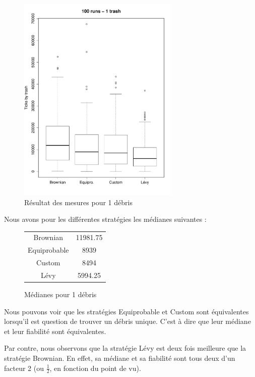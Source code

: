 

\begin{figure}[H]
	\begin{center}
		\includegraphics[height=10cm]{diagrams/1Tr_all.pdf}
		\caption{Résultat des mesures pour 1 débris}
		\label{fig:1Trash}
	\end{center}
\end{figure}


Nous avons pour les différentes stratégies les médianes suivantes :

\begin{figure}[H]
	\begin{center}
		\begin{tabular}{ | c | c | }
			\hline
			Brownian & 11981.75 \\
			Equiprobable & 8939 \\
			Custom & 8494 \\
			Lévy & 5994.25 \\
			\hline
		\end{tabular}
		\caption{{Médianes pour 1 débris}}
	\end{center}
\end{figure}


Nous pouvons voir que les stratégies Equiprobable et Custom sont
équivalentes lorsqu'il est question de trouver un débris unique.
C'est à dire que leur médiane et leur fiabilité sont équivalentes.

Par contre, nous observons que la stratégie Lévy est deux fois
meilleure que la stratégie Brownian. En effet, sa médiane et sa
fiabilité sont tous deux d'un facteur 2 (ou $\frac{1}{2}$, en fonction du
point de vu).


